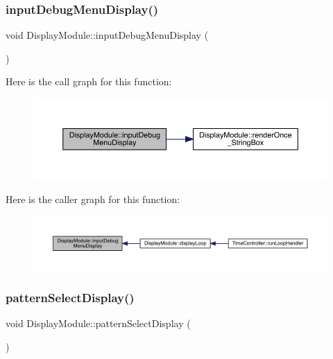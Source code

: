 \subsubsection{\texorpdfstring{input\+Debug\+Menu\+Display()}{inputDebugMenuDisplay()}}
{\footnotesize\ttfamily void Display\+Module\+::input\+Debug\+Menu\+Display (\begin{DoxyParamCaption}{ }\end{DoxyParamCaption})}

Here is the call graph for this function\+:
\nopagebreak
\begin{figure}[H]
\begin{center}
\leavevmode
\includegraphics[width=350pt]{class_display_module_a776e918a0d9f50ae079d6839524cc471_cgraph}
\end{center}
\end{figure}
Here is the caller graph for this function\+:
\nopagebreak
\begin{figure}[H]
\begin{center}
\leavevmode
\includegraphics[width=350pt]{class_display_module_a776e918a0d9f50ae079d6839524cc471_icgraph}
\end{center}
\end{figure}
\mbox{\label{class_display_module_a95fa96a6b2d74b8d15eeb0c71786b1b2}} 
\subsubsection{\texorpdfstring{pattern\+Select\+Display()}{patternSelectDisplay()}}
{\footnotesize\ttfamily void Display\+Module\+::pattern\+Select\+Display (\begin{DoxyParamCaption}{ }\end{DoxyParamCaption})}


